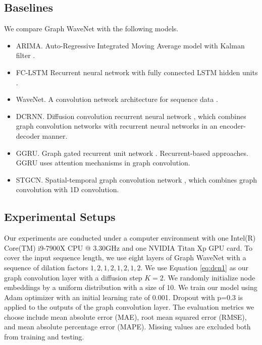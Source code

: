 \subsection{Baselines}
We compare Graph WaveNet with the following models.
\begin{itemize}
    \item ARIMA. Auto-Regressive Integrated Moving Average model with Kalman filter \cite{li2018diffusion}.
    \item FC-LSTM Recurrent neural network with fully connected LSTM hidden units \cite{li2018diffusion}.
    \item WaveNet. A convolution network architecture for sequence data \cite{oord2016wavenet}. 
    \item DCRNN. Diffusion convolution recurrent neural network \cite{li2018diffusion}, which combines graph convolution networks with recurrent neural networks in an encoder-decoder manner.
    \item GGRU. Graph gated recurrent unit network \cite{zhang2018gaan}. Recurrent-based approaches. GGRU uses attention mechanisms in graph convolution. 
    \item STGCN. Spatial-temporal graph convolution network \cite{yu2018spatio}, which combines graph convolution with 1D convolution.
 
\end{itemize}

\subsection{Experimental Setups}
Our experiments are conducted under a computer environment with one Intel(R) Core(TM) i9-7900X CPU @ 3.30GHz and one NVIDIA Titan Xp GPU card. To cover the input sequence length, we use eight layers of Graph WaveNet with a sequence of dilation factors $1,2,1,2,1,2,1,2$.  We use Equation \ref{eq:dcn1} as our graph convolution layer with a diffusion step $K=2$. We randomly initialize node embeddings by a uniform distribution with a size of 10. We train our model using Adam optimizer with an initial learning rate of 0.001. Dropout with p=0.3 is applied to the outputs of the graph convolution layer.  The evaluation metrics we choose include mean absolute error (MAE), root mean squared error (RMSE), and mean absolute percentage error (MAPE). Missing values are excluded both from training and testing.


